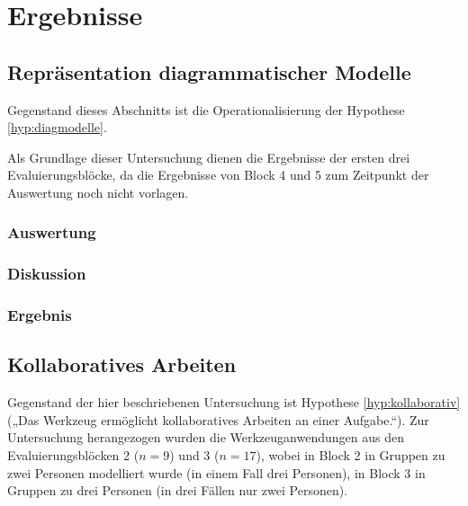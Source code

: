 
\section{Ergebnisse} %
\label{sec:ergebnisse}

\subsection{Repräsentation diagrammatischer Modelle} %
\label{sub:repräsentation_diagrammatischer_modelle}

Gegenstand dieses Abschnitts ist die Operationalisierung der Hypothese \ref{hyp:diagmodelle}.

Als Grundlage dieser Untersuchung dienen die Ergebnisse der ersten drei Evaluierungsblöcke, da die Ergebnisse von Block 4 und 5 zum Zeitpunkt der Auswertung noch nicht vorlagen.

\subsubsection{Auswertung} %

\subsubsection{Diskussion} %

\subsubsection{Ergebnis} %


\subsection{Kollaboratives Arbeiten} %
\label{sub:kollaboratives_arbeiten}

Gegenstand der hier beschriebenen Untersuchung ist Hypothese \ref{hyp:kollaborativ} („Das Werkzeug ermöglicht kollaboratives Arbeiten an einer Aufgabe.“). Zur Untersuchung herangezogen wurden die Werkzeuganwendungen aus den Evaluierungsblöcken 2 ($n=9$) und 3 ($n=17$), wobei in Block 2 in Gruppen zu zwei Personen modelliert wurde (in einem Fall drei Personen), in Block 3 in Gruppen zu drei Personen (in drei Fällen nur zwei Personen).

